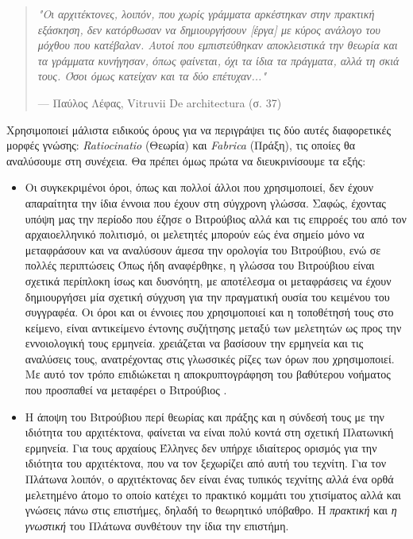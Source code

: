 \begin{quote}
{\itshape "Οι αρχιτέκτονες, λοιπόν, που χωρίς γράμματα αρκέστηκαν στην πρακτική 
εξάσκηση,  δεν κατόρθωσαν να δημιουργήσουν [έργα] με κύρος ανάλογο του μόχθου 
που κατέβαλαν. Αυτοί που εμπιστεύθηκαν αποκλειστικά την θεωρία και τα γράμματα 
κυνήγησαν, όπως φαίνεται, όχι τα ίδια τα πράγματα, αλλά τη σκιά τους. Όσοι όμως 
κατείχαν και τα δύο επέτυχαν..."}
\begin{flushright}
\footnotesize{--- Παύλος Λέφας, Vitruvii De architectura (σ. 37)}
\end{flushright}
\end{quote}

Χρησιμοποιεί μάλιστα ειδικούς όρους για να περιγράψει τις δύο αυτές 
διαφορετικές μορφές γνώσης: \emph{Ratiocinatio} (Θεωρία) και \emph{Fabrica} 
(Πράξη), τις οποίες θα αναλύσουμε στη συνέχεια. Θα πρέπει όμως πρώτα να 
διευκρινίσουμε τα εξής:

\begin{itemize}
\item Οι συγκεκριμένοι όροι, όπως και πολλοί άλλοι που χρησιμοποιεί, δεν έχουν 
απαραίτητα την ίδια έννοια που έχουν στη σύγχρονη γλώσσα. Σαφώς, έχοντας υπόψη 
μας την περίοδο που έζησε ο Βιτρούβιος αλλά και τις επιρροές του από τον 
αρχαιοελληνικό πολιτισμό, οι μελετητές μπορούν εώς ένα σημείο μόνο να 
μεταφράσουν και να αναλύσουν άμεσα την ορολογία του Βιτρούβιου, ενώ σε πολλές 
περιπτώσεις \sidenote%
    {Όπως ήδη αναφέρθηκε, η γλώσσα του Βιτρούβιου είναι σχετικά περίπλοκη ίσως και δυσνόητη, με αποτέλεσμα οι μεταφράσεις να έχουν δημιουργήσει μία σχετική σύγχυση για την πραγματική ουσία του κειμένου του συγγραφέα. Οι όροι και οι έννοιες που χρησιμοποιεί και η τοποθέτησή τους στο κείμενο, είναι αντικείμενο έντονης συζήτησης μεταξύ των μελετητών ως προς την εννοιολογική τους ερμηνεία.}
χρειάζεται να βασίσουν την ερμηνεία και τις αναλύσεις τους, ανατρέχοντας στις 
γλωσσικές ρίζες των όρων που χρησιμοποιεί. Με αυτό τον τρόπο επιδιώκεται η 
αποκρυπτογράφηση του βαθύτερου νοήματος που προσπαθεί να μεταφέρει ο Βιτρούβιος 
\cite{graham-education}.
\item Η άποψη του Βιτρούβιου περί θεωρίας και πράξης και η σύνδεσή τους με την 
ιδιότητα του αρχιτέκτονα, φαίνεται να είναι πολύ κοντά στη σχετική Πλατωνική 
ερμηνεία. Για τους αρχαίους Έλληνες δεν υπήρχε ιδιαίτερος ορισμός για την 
ιδιότητα του αρχιτέκτονα, που να τον ξεχωρίζει από αυτή του τεχνίτη. Για τον 
Πλάτωνα λοιπόν, ο αρχιτέκτονας δεν είναι ένας τυπικός τεχνίτης αλλά ένα ορθά 
μελετημένο άτομο το οποίο κατέχει το πρακτικό κομμάτι του χτισίματος αλλά και 
γνώσεις πάνω στις επιστήμες, δηλαδή το θεωρητικό υπόβαθρο. Η \emph{πρακτική} 
και \emph{η γνωστική} του Πλάτωνα συνθέτουν την ίδια την επιστήμη. 
\cite{graham-education}
\end{itemize}

